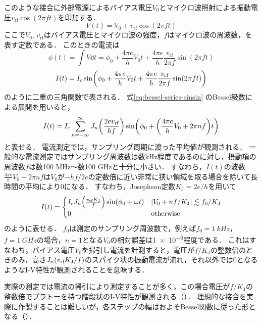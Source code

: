 \documentclass[dvipdfmx,autodetect-engine,12pt,fleqn]{jsarticle}
\begin{document}
このような接合に外部電源によるバイアス電圧$V_0$とマイクロ波照射による振動電圧$v_{\text{rf}}\cos(2\pi ft)$を印加する．
\begin{equation}
    V(t)=V_0+v_{\text{rf}}\cos(2\pi ft)
\end{equation}
ここで$V_0$, $v_{\text{rf}}$はバイアス電圧とマイクロ波の強度，$f$はマイクロ波の周波数，を表す定数である．
このときの電流は
\begin{equation}
    \phi(t) = \int V\dd t = \phi_0 + \frac{4\pi e}{h}V_0 t+\frac{4\pi e}{h}\frac{v_{\text{rf}}}{2\pi f}\sin(2\pi ft)
\end{equation}
\begin{equation}
    I(t) = I_c\sin\rbra*{\phi_0 + \frac{4\pi e}{h}V_0 t+\frac{4\pi e}{h}\frac{v_{\text{rf}}}{2\pi f}\sin(2\pi ft)}
\end{equation}
のように二重の三角関数で表される．
式\eqref{eq:bessel-series-sinsin} のBessel級数による展開を用いると，
\begin{equation}
    I(t) = I_{\text{c}}\sum_{n=-\infty}^\infty J_n\rbra*{\frac{2e v_{\text{rf}}}{hf}}
    \sin\rbra*{\phi_0 + \qty(\frac{4\pi e}{h}V_0 + 2\pi n f) t}
\end{equation}
と表せる．
電流測定では，サンプリング周期に渡った平均値が観測される．
一般的な電流測定ではサンプリング周波数は数\si{kHz}程度であるのに対し，摂動項の周波数$f$は数100 \si{MHz}～数100 \si{GHz}と十分に小さい．
すなわち，$I(t)$の波数$\frac{4\pi e}{h}V_0 + 2\pi n f$は$V_0$が$-hf/2e$の定数倍に近い非常に狭い領域を取る場合を除いて長時間の平均により0になる．
すなわち，Josephson定数$K_{\text{J}}=2e/h$を用いて
\begin{equation}
    I(t)=\begin{cases}
        I_{\text{c}} J_n\rbra*{\frac{ v_{\text{rf}}K_{\text{J}}}{f}}\sin(\phi_0+\omega t) & \abs{V_0+nf/K_{\text{J}}}\lesssim f_0/K_{\text{J}}\\
        0 & \text{otherwise}
    \end{cases}
\end{equation}
のように表せる．
$f_0$は測定のサンプリング周波数で，例えば$f_0=\SI{1}{kHz}$，$f=\SI{1}{GHz}$の場合，$n=1$となる$V_0$の相対誤差は\num{1e-6}程度である．
これはすなわち，バイアス電圧$V_0$を掃引し電流を計測すると，電圧が$f/K_{\text{J}}$の整数倍のときのみ，高さ$J_n\lparen{v_{\text{rf}}}K_{\text{J}}/{f}\rparen$のスパイク状の振動電流が流れ，それ以外では0となるようなI-V特性が観測されることを意味する．

実際の測定では電流の掃引により測定することが多く，この場合電圧が$f/K_{\text{J}}$の整数倍でプラトーを持つ階段状のI-V特性が観測される（）．
理想的な接合を実際に作製することは難しいが，各ステップの幅はおよそBessel関数に従った形となる（）．
\end{document}

